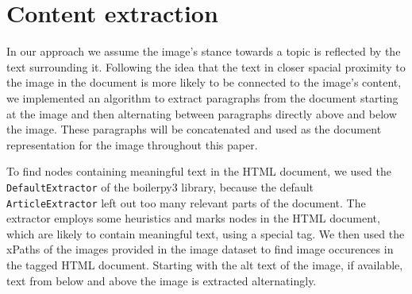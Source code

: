 \documentclass[
]{ceurart}
\begin{document}
\section{Content extraction} \label{content-extraction}

In our approach we assume the image's stance towards a topic is reflected by the text surrounding it. Following the idea that the text in closer spacial proximity to the image in the document is more likely to be connected to the image's content, we implemented an algorithm to extract paragraphs from the document starting at the image and then alternating between paragraphs directly above and below the image. These paragraphs will be concatenated and used as the document representation for the image throughout this paper.

To find nodes containing meaningful text in the HTML document, we used the \texttt{DefaultExtractor} of the boilerpy3 library, because the default \texttt{ArticleExtractor} left out too many relevant parts of the document. The extractor employs some heuristics and marks nodes in the HTML document, which are likely to contain meaningful text, using a special tag. We then used the xPaths of the images provided in the image dataset to find image occurences in the tagged HTML document. Starting with the alt text of the image, if available, text from below and above the image is extracted alternatingly.
\end{document}

